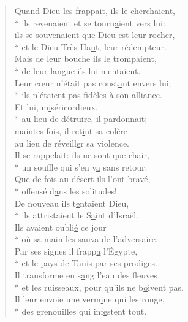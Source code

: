 \begin{verse}
Quand Dieu les frapp\underline{a}it, ils le cherchaient, \\*
ils revenaient et se tourn\underline{a}ient vers lui: \\
ils se souvenaient que Die\underline{u} est leur rocher, \\*
et le Dieu Très-Ha\underline{u}t, leur rédempteur. \\

Mais de leur bo\underline{u}che ils le trompaient, \\*
de leur l\underline{a}ngue ils lui mentaient. \\
Leur cœur n’était pas const\underline{a}nt envers lui; \\*
ils n’étaient pas fid\underline{è}les à son alliance. \\

Et lui, m\underline{i}séricordieux, \\*
au lieu de détru\underline{i}re, il pardonnait; \\
maintes fois, il ret\underline{i}nt sa colère \\
au lieu de réveill\underline{e}r sa violence. \\
Il se rappelait: ils ne s\underline{o}nt que chair, \\*
un souffle qui s’en v\underline{a} sans retour. \\

Que de fois au dés\underline{e}rt ils l’ont bravé, \\*
offensé d\underline{a}ns les solitudes! \\
De nouveau ils t\underline{e}ntaient Dieu, \\*
ils attristaient le S\underline{a}int d’Israël. \\
Ils avaient oubli\underline{é} ce jour \\*
où sa main les sauv\underline{a} de l’adversaire. \\

Par ses signes il frapp\underline{a} l’Égypte, \\*
et le pays de Tan\underline{i}s par ses prodiges. \\
Il transforme en s\underline{a}ng l’eau des fleuves \\*
et les ruisseaux, pour qu’ils ne b\underline{o}ivent pas. \\
Il leur envoie une verm\underline{i}ne qui les ronge, \\*
des grenouilles qui inf\underline{e}stent tout. \\


\end{verse}
